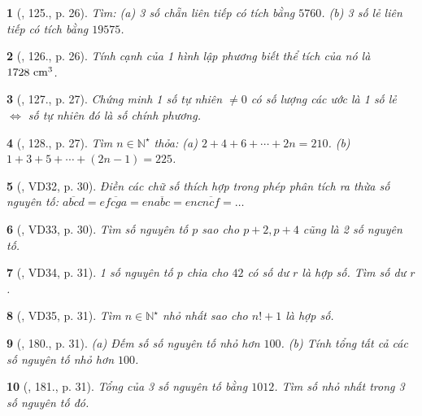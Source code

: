 \documentclass{article}
\newtheorem{baitoan}{}
\begin{document}
\begin{baitoan}[\cite{Tuyen_Toan_6}, 125., p. 26]
	Tìm: (a) 3 số chẵn liên tiếp có tích bằng $5760$. (b) 3 số lẻ liên tiếp có tích bằng $19575$.
\end{baitoan}

\begin{baitoan}[\cite{Tuyen_Toan_6}, 126., p. 26]
	Tính cạnh của 1 hình lập phương biết thể tích của nó là $\rm1728\ cm^3$.
\end{baitoan}

\begin{baitoan}[\cite{Tuyen_Toan_6}, 127., p. 27]
	Chứng minh 1 số tự nhiên $\ne0$ có số lượng các ước là 1 số lẻ $\Leftrightarrow$ số tự nhiên đó là số chính phương.
\end{baitoan}

\begin{baitoan}[\cite{Tuyen_Toan_6}, 128., p. 27]
	Tìm $n\in\mathbb{N}^\star$ thỏa: (a) $2 + 4 + 6 + \cdots + 2n = 210$. (b) $1 + 3 + 5 + \cdots + (2n - 1) = 225$.
\end{baitoan}

\begin{baitoan}[\cite{Binh_Toan_6_tap_1}, VD32, p. 30]
	Điền các chữ số thích hợp trong phép phân tích ra thừa số nguyên tố: $\overline{abcd} = e\overline{fcga} = en\overline{abc} = enc\overline{ncf} = \ldots$
\end{baitoan}

\begin{baitoan}[\cite{Binh_Toan_6_tap_1}, VD33, p. 30]
	Tìm số nguyên tố $p$ sao cho $p + 2,p + 4$ cũng là 2 số nguyên tố.
\end{baitoan}

\begin{baitoan}[\cite{Binh_Toan_6_tap_1}, VD34, p. 31]
	1 số nguyên tố $p$ chia cho $42$ có số dư $r$ là hợp số. Tìm số dư $r$.
\end{baitoan}

\begin{baitoan}[\cite{Binh_Toan_6_tap_1}, VD35, p. 31]
	Tìm $n\in\mathbb{N}^\star$ nhỏ nhất sao cho $n! + 1$ là hợp số.
\end{baitoan}

\begin{baitoan}[\cite{Binh_Toan_6_tap_1}, 180., p. 31]
	(a) Đếm số số nguyên tố nhỏ hơn $100$. (b) Tính tổng tất cả các số nguyên tố nhỏ hơn $100$.
\end{baitoan}

\begin{baitoan}[\cite{Binh_Toan_6_tap_1}, 181., p. 31]
	Tổng của 3 số nguyên tố bằng $1012$. Tìm số nhỏ nhất trong 3 số nguyên tố đó.
\end{baitoan}
\end{document}
